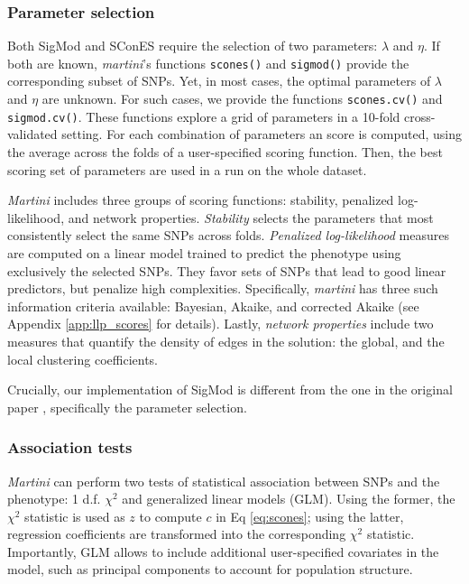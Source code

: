 \documentclass[a4paper]{article}
\begin{document}
    \subsubsection{Parameter selection}

    Both SigMod and SConES require the selection of two parameters: $\lambda$ and $\eta$. If both are known, \emph{martini}'s functions \texttt{scones()} and \texttt{sigmod()} provide the corresponding subset of SNPs. Yet, in most cases, the optimal parameters of $\lambda$ and $\eta$ are unknown. For such cases, we provide the functions \texttt{scones.cv()} and \texttt{sigmod.cv()}. These functions explore a grid of parameters in a 10-fold cross-validated setting. For each combination of parameters an score is computed, using the average across the folds of a user-specified scoring function. Then, the best scoring set of parameters are used in a run on the whole dataset.
    
    \emph{Martini} includes three groups of scoring functions: stability, penalized log-likelihood, and network properties. \emph{Stability} selects the parameters that most consistently select the same SNPs across folds. \emph{Penalized log-likelihood} measures are computed on a linear model trained to predict the phenotype using exclusively the selected SNPs. They favor sets of SNPs that lead to good linear predictors, but penalize high complexities. Specifically, \emph{martini} has three such information criteria available: Bayesian, Akaike, and corrected Akaike (see Appendix \ref{app:llp_scores} for details). Lastly, \emph{network properties} include two measures that quantify the density of edges in the solution: the global, and the local clustering coefficients. 
    
    
    Crucially, our implementation of SigMod is different from the one in the original paper \cite{liuSigModExactEfficient2017}, specifically the parameter selection.
    
    \subsubsection{Association tests}

    \emph{Martini} can perform two tests of statistical association between SNPs and the phenotype: 1 d.f. $\chi^2$ and generalized linear models (GLM). Using the former, the $\chi^2$ statistic is used as $z$ to compute $c$ in Eq \ref{eq:scones}; using the latter, regression coefficients are transformed into the corresponding $\chi^2$ statistic. Importantly, GLM allows to include additional user-specified covariates in the model, such as principal components to account for population structure.
\end{document}
